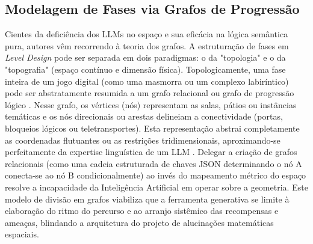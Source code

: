 \subsection{Modelagem de Fases via Grafos de Progressão}

Cientes da deficiência dos LLMs no espaço e sua eficácia na lógica semântica pura, autores vêm recorrendo à teoria dos grafos. A estruturação de fases em \textit{Level Design} pode ser separada em dois paradigmas: o da "topologia" e o da "topografia" (espaço contínuo e dimensão física).
Topologicamente, uma fase inteira de um jogo digital (como uma masmorra ou um complexo labiríntico) pode ser abstratamente resumida a um grafo relacional ou grafo de progressão lógico \cite{chen2025narrative}. Nesse grafo, os vértices (nós) representam as salas, pátios ou instâncias temáticas e os nós direcionais ou arestas delineiam a conectividade (portas, bloqueios lógicos ou teletransportes). 
Esta representação abstrai completamente as coordenadas flutuantes ou as restrições tridimensionais, aproximando-se perfeitamente da expertise linguística de um LLM \cite{Gallotta_2024}. Delegar a criação de grafos relacionais (como uma cadeia estruturada de chaves JSON determinando o nó A conecta-se ao nó B condicionalmente) ao invés do mapeamento métrico do espaço resolve a incapacidade da Inteligência Artificial em operar sobre a geometria. Este modelo de divisão em grafos viabiliza que a ferramenta generativa se limite à elaboração do ritmo do percurso e ao arranjo sistêmico das recompensas e ameaças, blindando a arquitetura do projeto de alucinações matemáticas espaciais.

